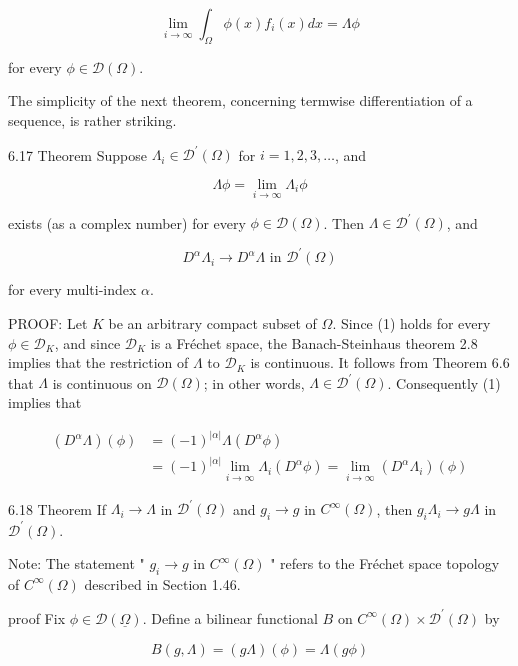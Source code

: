 \documentclass[10pt]{article}
\begin{document}
$$
\lim _{i \rightarrow \infty} \int_{\Omega} \phi(x) f_{i}(x) d x=\Lambda \phi
$$

for every $\phi \in \mathscr{D}(\Omega)$.

The simplicity of the next theorem, concerning termwise differentiation of a sequence, is rather striking.

6.17 Theorem Suppose $\Lambda_{i} \in \mathscr{D}^{\prime}(\Omega)$ for $i=1,2,3, \ldots$, and

$$
\Lambda \phi=\lim _{i \rightarrow \infty} \Lambda_{i} \phi
$$

exists (as a complex number) for every $\phi \in \mathscr{D}(\Omega)$. Then $\Lambda \in \mathscr{D}^{\prime}(\Omega)$, and

$$
D^{\alpha} \Lambda_{i} \rightarrow D^{\alpha} \Lambda \text { in } \mathscr{D}^{\prime}(\Omega)
$$

for every multi-index $\alpha$.

PROOF: Let $K$ be an arbitrary compact subset of $\Omega$. Since (1) holds for every $\phi \in \mathscr{D}_{K}$, and since $\mathscr{D}_{K}$ is a Fréchet space, the Banach-Steinhaus theorem 2.8 implies that the restriction of $\Lambda$ to $\mathscr{D}_{K}$ is continuous. It follows from Theorem 6.6 that $\Lambda$ is continuous on $\mathscr{D}(\Omega)$; in other words, $\Lambda \in \mathscr{D}^{\prime}(\Omega)$. Consequently (1) implies that

$$
\begin{aligned}
\left(D^{\alpha} \Lambda\right)(\phi) & =(-1)^{|\alpha|} \Lambda\left(D^{\alpha} \phi\right) \\
& =(-1)^{|\alpha|} \lim _{i \rightarrow \infty} \Lambda_{i}\left(D^{\alpha} \phi\right)=\lim _{i \rightarrow \infty}\left(D^{\alpha} \Lambda_{i}\right)(\phi)
\end{aligned}
$$

6.18 Theorem If $\Lambda_{i} \rightarrow \Lambda$ in $\mathscr{D}^{\prime}(\Omega)$ and $g_{i} \rightarrow g$ in $C^{\infty}(\Omega)$, then $g_{i} \Lambda_{i} \rightarrow g \Lambda$ in $\mathscr{D}^{\prime}(\Omega)$.

Note: The statement " $g_{i} \rightarrow g$ in $C^{\infty}(\Omega)$ " refers to the Fréchet space topology of $C^{\infty}(\Omega)$ described in Section 1.46.

proof Fix $\phi \in \mathscr{D}(\underline{\Omega})$. Define a bilinear functional $B$ on $C^{\infty}(\Omega) \times \mathscr{D}^{\prime}(\Omega)$ by

$$
B(g, \Lambda)=(g \Lambda)(\phi)=\Lambda(g \phi)
$$
\end{document}
